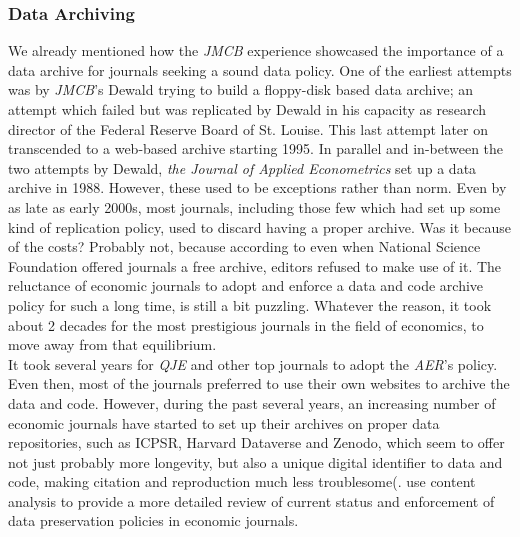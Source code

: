 \documentclass[11pt]{article}
\begin{document}
\subsubsection{Data Archiving}
We already mentioned how the \textit{JMCB} experience showcased the importance of a data archive for journals seeking a sound data policy. One of the earliest attempts was by \textit{JMCB}'s Dewald  trying to build a floppy-disk based data archive; an attempt which failed but was replicated by Dewald in his capacity as research director of the Federal Reserve Board of St. Louise. This last attempt later on transcended to a web-based archive starting 1995. In parallel and in-between the two attempts by Dewald, \textit{the Journal of Applied Econometrics} set up a data archive in 1988. However, these used to be exceptions rather than norm. Even by as late as early 2000s, most journals, including those few which had set up some kind of replication policy, used to discard having a proper archive. Was it because of the costs? Probably not, because according to \cite{anderson1994replication} even when National Science Foundation offered journals a free archive, editors refused to make use of it. The reluctance of economic journals to adopt and enforce a data and code archive policy for such a long time, is still a bit puzzling. Whatever the reason, it took about 2 decades for the most prestigious journals in the field of economics, to move away from that equilibrium.\\

It took several years for \textit{QJE} and other top journals to adopt the \textit{AER}'s policy. Even then, most of the journals preferred to use their own websites to archive the data and code. However, during the past several years, an increasing number of economic journals have started to set up their archives on proper data repositories, such as ICPSR, Harvard Dataverse and Zenodo, which seem to offer not just probably more longevity, but also a unique digital identifier to data and code, making citation and reproduction much less troublesome(\cite{vilhuber2020reproducibility}. \cite{currier2021safeguarding} use content analysis to provide a more detailed review of current status and enforcement of data preservation policies in economic journals.
\end{document}
